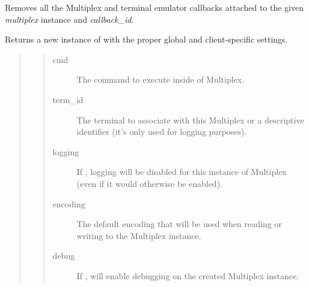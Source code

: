 \documentclass[letterpaper,10pt,openany]{sphinxmanual}
\begin{document}
\begin{fulllineitems}

\begin{fulllineitems}
\label{Applications/terminal/app_terminal:app_terminal.TerminalApplication.remove_terminal_callbacks}
Removes all the Multiplex and terminal emulator callbacks attached to
the given \emph{multiplex} instance and \emph{callback\_id}.

\end{fulllineitems}


\begin{fulllineitems}
\label{Applications/terminal/app_terminal:app_terminal.TerminalApplication.new_multiplex}
Returns a new instance of  with the proper
global and client-specific settings.
\begin{quote}
\begin{quote}\begin{description}
\item[{cmd}] \leavevmode
The command to execute inside of Multiplex.

\item[{term\_id}] \leavevmode
The terminal to associate with this Multiplex or a descriptive
identifier (it's only used for logging purposes).

\item[{logging}] \leavevmode
If , logging will be disabled for this instance of
Multiplex (even if it would otherwise be enabled).

\item[{encoding}] \leavevmode
The default encoding that will be used when reading or writing
to the Multiplex instance.

\item[{debug}] \leavevmode
If , will enable debugging on the created Multiplex
instance.

\end{description}\end{quote}
\end{quote}

\end{fulllineitems}


\end{fulllineitems}
\end{document}
